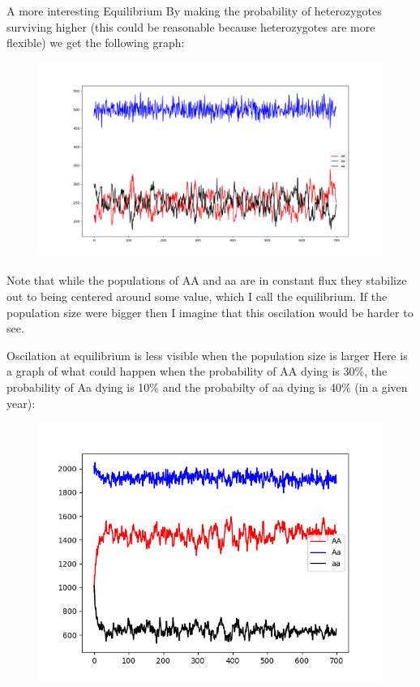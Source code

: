 \documentclass[xcolor=x11names, svgnames, rgb]{beamer}
\begin{document}
\begin{frame}[t]{A more interesting Equilibrium}
	By making the probability of heterozygotes surviving higher (this could be reasonable because heterozygotes are more flexible) we get the following graph: 

\begin{center}
	\begin{figure}
		\includegraphics[width=0.6\linewidth]{sim3.png} 
\end{figure}	
\end{center}	
Note that while the populations of AA and aa are in constant flux they stabilize out to being centered around some value, which I call the equilibrium. If the population size were bigger then I imagine that this oscilation would be harder to see.
	
\end{frame}

\begin{frame}[t]{Oscilation at equilibrium is less visible when the population size is larger}
	Here is a graph of what could happen when the probability of AA dying is 30\%, the probability of Aa dying is 10\% and the probabilty of aa dying is 40\% (in a given year):
\begin{center}
	\begin{figure}
		\includegraphics[width=0.6\linewidth]{sim4.png} 
\end{figure}	
\end{center}	
\end{frame}
\end{document}
